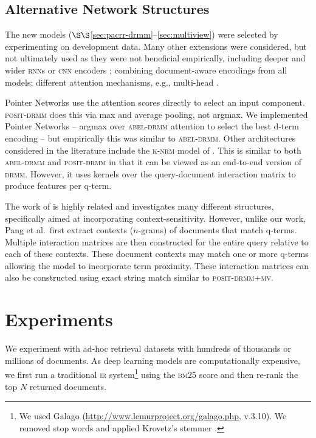\documentclass[11pt,a4paper]{article}
\newcommand{\rnn}{\textsc{rnn}\xspace}
\newcommand{\cnn}{\textsc{cnn}\xspace}
\newcommand{\ir}{\textsc{ir}\xspace}
\newcommand{\drmm}{\textsc{drmm}\xspace}
\newcommand{\abeldrmm}{\textsc{abel-drmm}\xspace}
\newcommand{\positdrmm}{\textsc{posit-drmm}\xspace}
\newcommand{\positdrmmmv}{\textsc{posit-drmm+mv}\xspace}
\newcommand{\bmtf}{\textsc{bm25}\xspace}
\begin{document}
\subsection{Alternative Network Structures}

The new models 
($\S\S$\ref{sec:pacrr-drmm}--\ref{sec:multiview}) were selected by experimenting on development data. Many other extensions were considered, but not ultimately used as they were not beneficial empirically, including deeper and wider \rnn{s} or \cnn encoders \cite{bai2018empirical}; combining 
document-aware encodings from all models;  different attention mechanisms, e.g., multi-head \cite{vaswani2017attention}.

Pointer Networks \cite{vinyals2015pointer} use the attention 
scores directly to select an input component. 
\positdrmm does this via max and average pooling, not argmax.
We implemented Pointer Networks -- argmax over \abeldrmm attention to select the best d-term encoding -- but empirically this was similar to \abeldrmm.
Other architectures considered in the literature include the 
\textsc{k-nrm} model of . This 
is similar to both \abeldrmm and \positdrmm in that it can be viewed as an end-to-end version of \drmm. However, it uses kernels over the query-document interaction matrix to produce features per q-term.

The work of  
is highly related and investigates many different structures, specifically aimed at incorporating context-sensitivity. However, unlike our work, Pang et al.\ first extract contexts 
($n$-grams) of documents that match q-terms. Multiple interaction matrices are then constructed for the entire query relative to each of these contexts. These document contexts may match one or more q-terms allowing the model to incorporate term proximity. These interaction matrices can also be constructed using exact string match similar to \positdrmmmv.



\section{Experiments}

We experiment with ad-hoc retrieval datasets with hundreds of thousands or millions of documents.  
As deep learning models are computationally expensive, we first run a traditional \ir system\footnote{We used Galago (\url{http://www.lemurproject.org/galago.php}, v.3.10). We removed stop words and applied Krovetz's stemmer \cite{krovetz1993krovetzstemmer}.} using the \bmtf score \cite{robertson2009probabilistic} and then re-rank the top $N$ returned documents.
\end{document}
